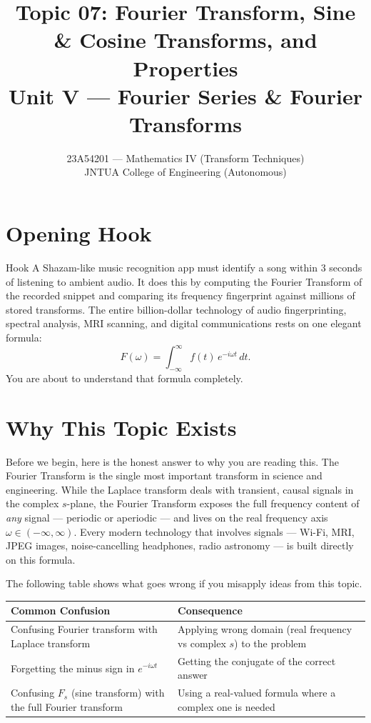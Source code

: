 \documentclass[12pt,a4paper]{article}
\title{Topic 07: Fourier Transform, Sine \& Cosine Transforms, and Properties \\
       \large Unit V --- Fourier Series \& Fourier Transforms}
\author{23A54201 --- Mathematics IV (Transform Techniques) \\
        JNTUA College of Engineering (Autonomous)}
\date{}
\begin{document}
\maketitle
\tableofcontents
\newpage

\section{Opening Hook}

\begin{curiositybox}{Hook}
A Shazam-like music recognition app must identify a song within 3 seconds of listening to ambient audio.
It does this by computing the Fourier Transform of the recorded snippet and comparing its frequency fingerprint
against millions of stored transforms.
The entire billion-dollar technology of audio fingerprinting, spectral analysis, MRI scanning, and digital
communications rests on one elegant formula:
\[
  F(\omega) = \int_{-\infty}^{\infty} f(t)\,e^{-i\omega t}\,dt.
\]
You are about to understand that formula completely.
\end{curiositybox}

\section{Why This Topic Exists}

Before we begin, here is the honest answer to why you are reading this.
The Fourier Transform is the single most important transform in science and engineering.
While the Laplace transform deals with transient, causal signals in the complex $s$-plane,
the Fourier Transform exposes the full frequency content of \emph{any} signal --- periodic or aperiodic ---
and lives on the real frequency axis $\omega \in (-\infty, \infty)$.
Every modern technology that involves signals --- Wi-Fi, MRI, JPEG images, noise-cancelling headphones,
radio astronomy --- is built directly on this formula.

\vspace{0.5em}
\noindent The following table shows what goes wrong if you misapply ideas from this topic.

\vspace{0.5em}
\begin{tabular}{@{} p{6.5cm} p{7.5cm} @{}}
\toprule
\textbf{Common Confusion} & \textbf{Consequence} \\
\midrule
Confusing Fourier transform with Laplace transform &
  Applying wrong domain (real frequency vs complex $s$) to the problem \\
\midrule
Forgetting the minus sign in $e^{-i\omega t}$ &
  Getting the conjugate of the correct answer \\
\midrule
Confusing $F_s$ (sine transform) with the full Fourier transform &
  Using a real-valued formula where a complex one is needed \\
\bottomrule
\end{tabular}
\end{document}
